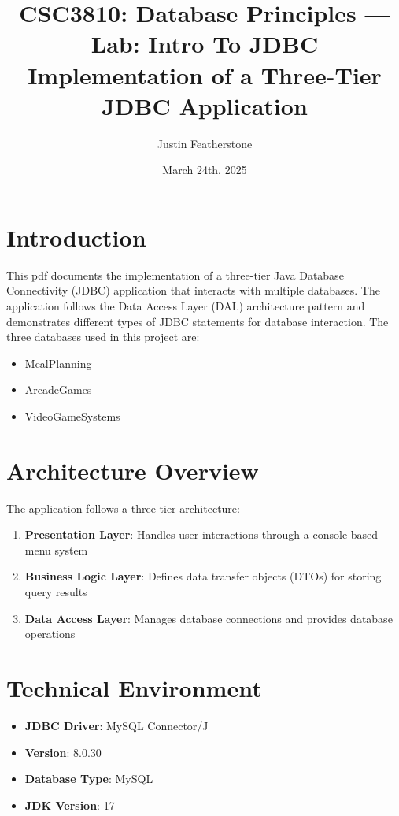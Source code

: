 \documentclass[12pt]{article}
\title{CSC3810: Database Principles --- Lab: Intro To JDBC\\\large Implementation of a Three-Tier JDBC Application}
\author{Justin Featherstone}
\date{March 24th, 2025}
\begin{document}
\maketitle

\section{Introduction}
This pdf documents the implementation of a three-tier Java Database
Connectivity (JDBC) application that interacts with multiple databases. The
application follows the Data Access Layer (DAL) architecture pattern and
demonstrates different types of JDBC statements for database interaction. The
three databases used in this project are:
\begin{itemize}
    \item MealPlanning
    \item ArcadeGames
    \item VideoGameSystems
\end{itemize}

\section{Architecture Overview}
The application follows a three-tier architecture:

\begin{enumerate}
    \item \textbf{Presentation Layer}: Handles user interactions through a console-based menu system
    \item \textbf{Business Logic Layer}: Defines data transfer objects (DTOs) for storing query results
    \item \textbf{Data Access Layer}: Manages database connections and provides database operations
\end{enumerate}

\section{Technical Environment}
\begin{itemize}
    \item \textbf{JDBC Driver}: MySQL Connector/J
    \item \textbf{Version}: 8.0.30
    \item \textbf{Database Type}: MySQL
    \item \textbf{JDK Version}: 17
\end{itemize}
\end{document}
